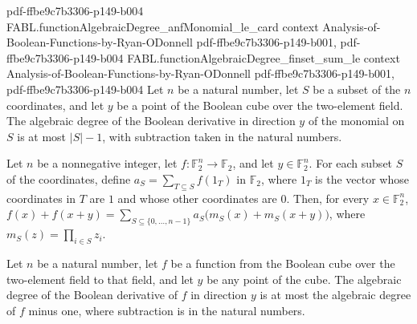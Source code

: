 \begin{theorem}
{    pdf-ffbe9c7b3306-p149-b004}
\proofstep
  {FABL.functionAlgebraicDegree_anfMonomial_le_card}
  {context}
  {Analysis-of-Boolean-Functions-by-Ryan-ODonnell}
  {pdf-ffbe9c7b3306-p149-b001,
    pdf-ffbe9c7b3306-p149-b004}
\proofstep
  {FABL.functionAlgebraicDegree_finset_sum_le}
  {context}
  {Analysis-of-Boolean-Functions-by-Ryan-ODonnell}
  {pdf-ffbe9c7b3306-p149-b001,
    pdf-ffbe9c7b3306-p149-b004}
Let $n$ be a natural number, let $S$ be a subset of the $n$ coordinates, and let $y$ be
a point of the Boolean cube over the two-element field. The algebraic degree of the
Boolean derivative in direction $y$ of the monomial on $S$ is at most $|S|-1$, with
subtraction taken in the natural numbers.
\end{theorem}

\begin{theorem}
\label{FABL.booleanDerivative_eq_sum_anfMonomial}
\leanok
{}
Let $n$ be a nonnegative integer, let $f\colon\mathbb{F}_2^n\to\mathbb{F}_2$, and let
$y\in\mathbb{F}_2^n$. For each subset $S$ of the coordinates, define
$a_S=\displaystyle\sum_{T\subseteq S} f(1_T)$ in $\mathbb{F}_2$, where $1_T$ is the
vector whose coordinates in $T$ are $1$ and whose other coordinates are $0$. Then, for
every $x\in\mathbb{F}_2^n$,
$f(x)+f(x+y)=\displaystyle\sum_{S\subseteq\{0,\ldots,n-1\}}a_S\bigl(m_S(x)+m_S(x+y)\bigr)$,
where $m_S(z)=\prod_{i\in S}z_i$.
\end{theorem}

\begin{theorem}
\label{FABL.functionAlgebraicDegree_booleanDerivative_le}
\leanok
{}
Let $n$ be a natural number, let $f$ be a function from the Boolean cube over the
two-element field to that field, and let $y$ be any point of the cube. The algebraic
degree of the Boolean derivative of $f$ in direction $y$ is at most the algebraic degree
of $f$ minus one, where subtraction is in the natural numbers.
\end{theorem}

